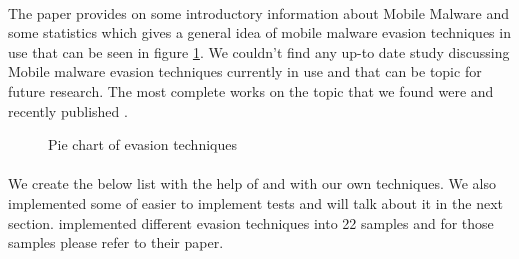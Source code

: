\documentclass[../main.tex]{subfile}
\begin{document}
	\paragraph{} The paper \cite{amro2018malware} provides on some introductory information about Mobile Malware and some statistics which gives a general idea of mobile malware evasion techniques in use that can be seen in figure \ref{fig:pie_evasion}. We couldn't find any up-to date study discussing Mobile malware evasion techniques currently in use and that can be topic for future research. The most complete works on the topic that we found were \cite{vidas2014evading} and recently published \cite{ares}.
	
	\begin{figure}[H]
		\centering
		\caption{Pie chart of evasion techniques \cite{amro2018malware}}
		\label{fig:pie_evasion}			
	\end{figure}
	
	
	\paragraph{} We create the below list with the help of \cite{vidas2014evading} \cite{sophos_anti_emulation} and with our own techniques. We also implemented some of easier to implement tests and will talk about it in the next section. \cite{ares} implemented different evasion techniques into 22 samples and for those samples please refer to their paper.
		
\end{document}
